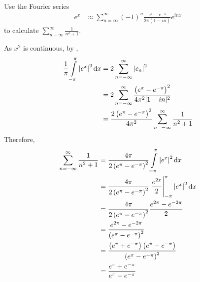 \documentclass[fleqn, a4paper, 12pt, twoside]{article}
\theoremstyle{definition}
\theoremstyle{theorem}
\begin{document}
\begin{question}
	Use the Fourier series
	\begin{align*}
		e^x & \approx \sum\limits_{n = \infty}^{\infty} (-1)^n \frac{e^{\pi} - e^{-\pi}}{2 \pi (1 - i n)} e^{i n x}
	\end{align*}
	to calculate $\sum\limits_{n - \infty}^{\infty} \frac{1}{n^2 + 1}$.
\end{question}

\begin{solution}
	As $x^2$ is continuous, by ,
	\begin{align*}
		\frac{1}{\pi} \int\limits_{-\pi}^{\pi} \left| e^x \right|^2 \dif x & = 2 \sum\limits_{n = -\infty}^{\infty} \left| c_n \right|^2                                            \\
                                                                                   & = 2 \sum\limits_{n = -\infty}^{\infty} \frac{\left( e^{\pi} - e^{-\pi} \right)^2}{4 \pi^2 |1 - i n|^2} \\
                                                                                   & = \frac{2 \left( e^{\pi} - e^{-\pi} \right)^2}{4 \pi^2} \sum\limits_{n = -\infty}^{\infty} \frac{1}{n^2 + 1}
	\end{align*}
	Therefore,
	\begin{align*}
		\sum\limits_{n = -\infty}^{\infty} \frac{1}{n^2 + 1} & = \frac{4 \pi}{2 \left( e^{\pi} - e^{-\pi} \right)^2} \int\limits_{-\pi}^{\pi} \left| e^x \right|^2 \dif x                      \\
                                                                     & = \frac{4 \pi}{2 \left( e^{\pi} - e^{-\pi} \right)^2} \left. \frac{e^{2 x}}{2} \right|_{-\pi}^{\pi} \left| e^x \right|^2 \dif x \\
                                                                     & = \frac{4 \pi}{2 \left( e^{\pi} - e^{-\pi} \right)^2} \frac{e^{2 \pi} - e^{-2 \pi}}{2}                                          \\
                                                                     & = \frac{e^{2 \pi} - e^{-2 \pi}}{\left( e^{\pi} - e^{-\pi} \right)^2}                                                            \\
                                                                     & = \frac{\left( e^{\pi} + e^{-\pi} \right) \left( e^{\pi} - e^{-\pi} \right)}{\left( e^{\pi} - e^{-\pi} \right)^2}               \\
                                                                     & = \frac{e^{\pi} + e^{-\pi}}{e^{\pi} - e^{-\pi}}
	\end{align*}
\end{solution}
\end{document}
